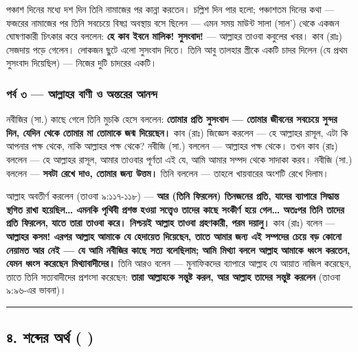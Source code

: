 পঞ্চাশ দিনের মধ্যে দশ দিন তিনি নামাজের পর কান্না করতেন। চল্লিশ দিন পার হলো; পঞ্চাশতম দিনের কথা — ফজরের নামাজের পর তিনি সবচেয়ে বিষণ্ণ অবস্থায় বসে ছিলেন — এমন সময় মাউন্ট সালা (সাল') থেকে একজন ঘোষণাকারী চিৎকার করে বললেন: \textbf{হে কাব ইবনে মালিক! সুসংবাদ!} — আল্লাহর তাওবা কবুলের খবর। কাব (রাঃ) সেজদায় পড়ে গেলেন। লোকজন ছুটে এলো সুসংবাদ দিতে। তিনি আবু তালহার স্ত্রীকে একটি চাদর দিলেন (যে প্রথম সুসংবাদ দিয়েছিল) — নিজের দুটি চাদরের একটি।

\subsubsection*{পর্ব ৩ — আল্লাহর বাণী ও অন্তরের আনন্দ}

নবীজির (সা.) কাছে গেলে তিনি মুচকি হেসে বললেন: \textbf{তোমার প্রতি সুসংবাদ — তোমার জীবনের সবচেয়ে সুন্দর দিন, যেদিন থেকে তোমার মা তোমাকে জন্ম দিয়েছেন।} কাব (রাঃ) জিজ্ঞেস করলেন — হে আল্লাহর রাসূল, এটা কি আপনার পক্ষ থেকে, নাকি আল্লাহর পক্ষ থেকে? নবীজি (সা.) বললেন — আল্লাহর পক্ষ থেকে। তখন কাব (রাঃ) বললেন — হে আল্লাহর রাসূল, আমার তাওবার পূর্ণতা এই যে, আমি আমার সম্পদ থেকে সাদাকা করব। নবীজি (সা.) বললেন — \textbf{সবটা রেখে দাও, তোমার জন্য উত্তম।} তিনি বললেন — তাহলে খায়বারের অংশটি রেখে দিলাম।

আল্লাহ অবতীর্ণ করলেন (তাওবা ৯:১১৭-১১৮) — \textbf{আর (তিনি ফিরলেন) তিনজনের প্রতি, যাদের ব্যাপারে সিদ্ধান্ত স্থগিত রাখা হয়েছিল… এমনকি পৃথিবী প্রশস্ত হওয়া সত্ত্বেও তাদের কাছে সংকীর্ণ হয়ে গেল… অতঃপর তিনি তাদের প্রতি ফিরলেন, যাতে তারা তাওবা করে। নিশ্চয়ই আল্লাহ তাওবা গ্রহণকারী, পরম দয়ালু।} কাব (রাঃ) বলেন — \textbf{আল্লাহর কসম! এরপর আল্লাহ আমাকে যে হেদায়েত দিয়েছেন, তাতে আমার জন্য এই সম্পদের চেয়ে বড় কোনো নেয়ামত আর নেই — যে আমি নবীজির কাছে সত্য বলেছিলাম; আমি মিথ্যা বললে আল্লাহ আমাকে ধ্বংস করতেন, যেমন ধ্বংস করেছেন মিথ্যাবাদীদের।} তিনি আরও বলেন — মুনাফিকদের ব্যাপারে আল্লাহ যে আয়াত নাজিল করেছেন, তাতে তিনি সত্যবাদীদের প্রশংসা করেছেন: \textbf{তারা আল্লাহকে সন্তুষ্ট করল, আর আল্লাহ তাদের সন্তুষ্ট করলেন} (তাওবা ৯:৯৬-এর ভাবনা)।

\medskip\hrule\medskip

\subsection*{৪. শব্দের অর্থ ( )}

